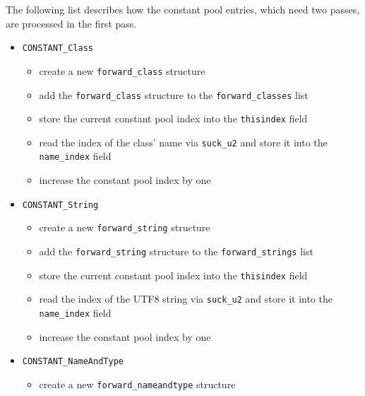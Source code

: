 The following list describes how the constant pool entries, which need
two passes, are processed in the first pass.

\begin{itemize}

 \item \texttt{CONSTANT\_Class}

 \begin{itemize}
  \item create a new \texttt{forward\_class} structure

  \item add the \texttt{forward\_class} structure to the
  \texttt{forward\_classes} list

  \item store the current constant pool index into the
  \texttt{thisindex} field

  \item read the index of the class' name via \texttt{suck\_u2} and
  store it into the \texttt{name\_index} field

  \item increase the constant pool index by one
 \end{itemize}

 \item \texttt{CONSTANT\_String}

 \begin{itemize}
  \item create a new \texttt{forward\_string} structure

  \item add the \texttt{forward\_string} structure to the \texttt{forward\_strings} list

  \item store the current constant pool index into the \texttt{thisindex} field

  \item read the index of the UTF8 string via \texttt{suck\_u2} and store it into the \texttt{name\_index} field

  \item increase the constant pool index by one
 \end{itemize}

 \item \texttt{CONSTANT\_NameAndType}

 \begin{itemize}
  \item create a new \texttt{forward\_nameandtype} structure


\end{itemize}
\end{itemize}
